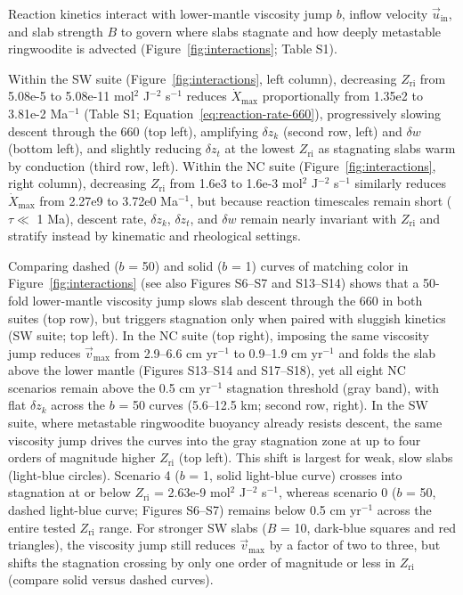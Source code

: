 \documentclass[draft,linenumbers]{agujournal2019}
\begin{document}
Reaction kinetics interact with lower-mantle viscosity jump \(b\),
inflow velocity \(\vec{u}_\mathrm{in}\), and slab strength \(B\) to
govern where slabs stagnate and how deeply metastable ringwoodite is
advected (Figure~\ref{fig:interactions}; Table S1).

Within the SW suite (Figure~\ref{fig:interactions}, left column),
decreasing \(Z_\mathrm{ri}\) from 5.08e-5 to 5.08e-11 mol\(^2\)
J\(^{-2}\) s\(^{-1}\) reduces \(\dot{X}_\mathrm{max}\) proportionally
from 1.35e2 to 3.81e-2 Ma\(^{-1}\) (Table S1;
Equation~\ref{eq:reaction-rate-660}), progressively slowing descent
through the 660 (top left), amplifying \(\delta z_k\) (second row, left)
and \(\delta w\) (bottom left), and slightly reducing \(\delta z_t\) at
the lowest \(Z_\mathrm{ri}\) as stagnating slabs warm by conduction
(third row, left). Within the NC suite (Figure~\ref{fig:interactions},
right column), decreasing \(Z_\mathrm{ri}\) from 1.6e3 to 1.6e-3
mol\(^2\) J\(^{-2}\) s\(^{-1}\) similarly reduces
\(\dot{X}_\mathrm{max}\) from 2.27e9 to 3.72e0 Ma\(^{-1}\), but because
reaction timescales remain short (\(\tau \ll\) 1 Ma), descent rate,
\(\delta z_k\), \(\delta z_t\), and \(\delta w\) remain nearly invariant
with \(Z_\mathrm{ri}\) and stratify instead by kinematic and rheological
settings.

Comparing dashed (\(b\) = 50) and solid (\(b\) = 1) curves of matching
color in Figure~\ref{fig:interactions} (see also Figures S6--S7 and
S13--S14) shows that a 50-fold lower-mantle viscosity jump slows slab
descent through the 660 in both suites (top row), but triggers
stagnation only when paired with sluggish kinetics (SW suite; top left).
In the NC suite (top right), imposing the same viscosity jump reduces
\(\vec{v}_\mathrm{max}\) from 2.9--6.6 cm yr\(^{-1}\) to 0.9--1.9 cm
yr\(^{-1}\) and folds the slab above the lower mantle (Figures S13--S14
and S17--S18), yet all eight NC scenarios remain above the 0.5 cm
yr\(^{-1}\) stagnation threshold (gray band), with flat \(\delta z_k\)
across the \(b\) = 50 curves (5.6--12.5 km; second row, right). In the
SW suite, where metastable ringwoodite buoyancy already resists descent,
the same viscosity jump drives the curves into the gray stagnation zone
at up to four orders of magnitude higher \(Z_\mathrm{ri}\) (top left).
This shift is largest for weak, slow slabs (light-blue circles).
Scenario 4 (\(b\) = 1, solid light-blue curve) crosses into stagnation
at or below \(Z_\mathrm{ri}\) = 2.63e-9 mol\(^2\) J\(^{-2}\) s\(^{-1}\),
whereas scenario 0 (\(b\) = 50, dashed light-blue curve; Figures S6--S7)
remains below 0.5 cm yr\(^{-1}\) across the entire tested
\(Z_\mathrm{ri}\) range. For stronger SW slabs (\(B\) = 10, dark-blue
squares and red triangles), the viscosity jump still reduces
\(\vec{v}_\mathrm{max}\) by a factor of two to three, but shifts the
stagnation crossing by only one order of magnitude or less in
\(Z_\mathrm{ri}\) (compare solid versus dashed curves).
\end{document}
